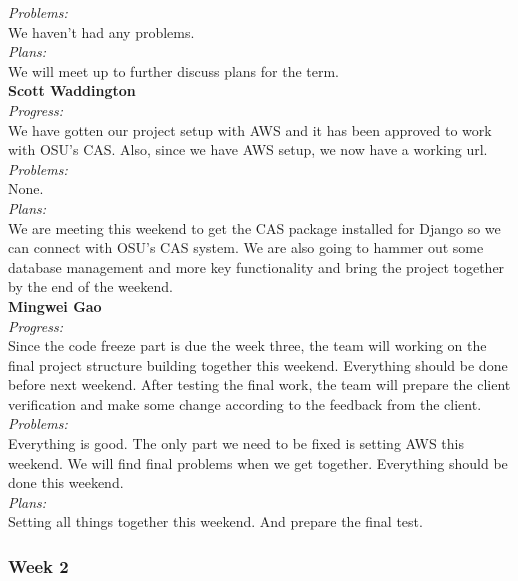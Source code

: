 \noindent\textit{Problems:}\\
\noindent We haven't had any problems.\\

\noindent\textit{Plans:}\\
\noindent We will meet up to further discuss plans for the term.\\

\noindent\textbf{Scott Waddington}\\
\noindent\textit{Progress:}\\
We have gotten our project setup with AWS and it has been approved to work with OSU's CAS. Also, since we have AWS setup, we now have a working url.\\

\noindent\textit{Problems:}\\
\noindent None.\\

\noindent\textit{Plans:}\\
\noindent We are meeting this weekend to get the CAS package installed for Django so we can connect with OSU's CAS system. We are also going to hammer out some database management and more key functionality and bring the project together by the end of the weekend.\\

\noindent\textbf{Mingwei Gao}\\
\noindent\textit{Progress:}\\
 Since the code freeze part is due the week three, the team will working on the final project structure building together this weekend. Everything should be done before next weekend. After testing the final work, the team will prepare the client verification and make some change according to the feedback from the client.\\

\noindent\textit{Problems:}\\
\noindent Everything is good. The only part we need to be fixed is setting AWS this weekend. We will find final problems when we get together. Everything should be done this weekend.\\

\noindent\textit{Plans:}\\
\noindent Setting all things together this weekend. And prepare the final test.\\

\subsubsection{Week 2}

